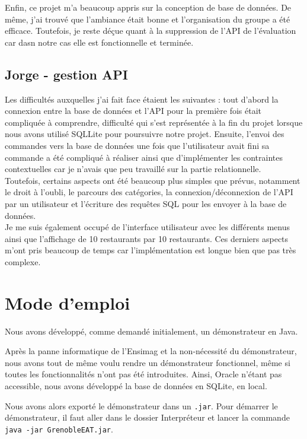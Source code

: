 \documentclass[10pt, a4paper]{article}
\begin{document}
Enfin, ce projet m'a beaucoup appris sur la conception de base de données. De même, j'ai trouvé
que l'ambiance était bonne et l'organisation du groupe a été efficace. Toutefois, je reste déçue
quant à la suppression de l'API de l'évaluation car dasn notre cas elle est fonctionnelle et terminée.

\subsection{Jorge - gestion API}
Les difficultés auxquelles j'ai fait face étaient les suivantes : tout d'abord la connexion entre la base de données
et l'API pour la première fois était compliquée à comprendre, difficulté qui s'est représentée
à la fin du projet lorsque nous avons utilisé SQLLite pour poursuivre notre projet. Ensuite,
l'envoi des commandes vers la base de données une fois que l'utilisateur avait fini sa commande 
a été compliqué à réaliser ainsi que d'implémenter les contraintes contextuelles car je 
n'avais que peu travaillé sur la partie relationnelle. \\

Toutefois, certains aspects ont été beaucoup plus simples que prévus, notamment le droit à l'oubli,
le parcours des catégories, la connexion/déconnexion de l'API par un utilisateur et l'écriture
des requêtes SQL pour les envoyer à la base de données.\\

Je me suis également occupé de l'interface utilisateur avec les différents menus ainsi que l'affichage
de 10 restaurants par 10 restaurants. Ces derniers aspects m'ont pris beaucoup de temps car
l'implémentation est longue bien que pas très complexe.


\section{Mode d'emploi}

Nous avons développé, comme demandé initialement, un démonstrateur en Java.

Après la panne informatique de l'Ensimag et la non-nécessité du démonstrateur, nous avons tout de même voulu 
rendre un démonstrateur fonctionnel, même si toutes les fonctionnalités n'ont pas été introduites. Ainsi, Oracle n'étant pas accessible, 
nous avons développé la base de données en SQLite, en local.

Nous avons alors exporté le démonstrateur dans un \texttt{.jar}. Pour démarrer le démonstrateur, il faut aller 
dans le dossier Interpréteur et lancer la commande \texttt{java -jar GrenobleEAT.jar}. \\
\end{document}
